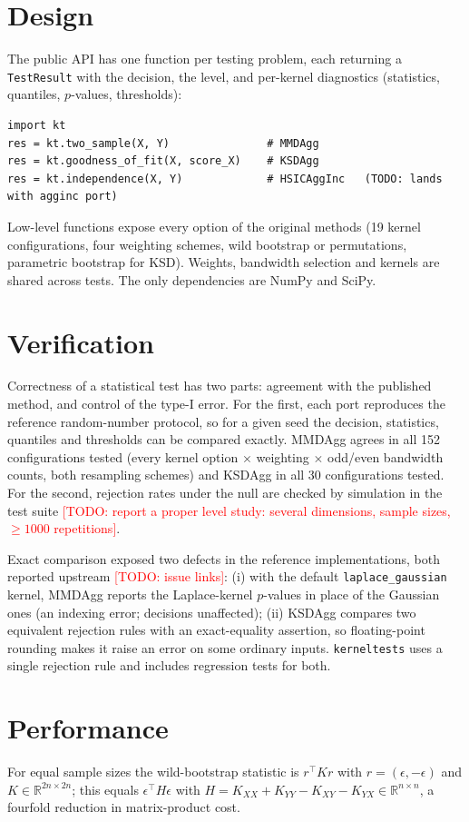 \documentclass[11pt]{article}
\newcommand{\todo}[1]{\textcolor{red}{[TODO: #1]}}
\begin{document}
\section{Design}
The public API has one function per testing problem, each returning a \texttt{TestResult} with the decision,
the level, and per-kernel diagnostics (statistics, quantiles, $p$-values, thresholds):
\begin{verbatim}
import kt
res = kt.two_sample(X, Y)               # MMDAgg
res = kt.goodness_of_fit(X, score_X)    # KSDAgg
res = kt.independence(X, Y)             # HSICAggInc   (TODO: lands with agginc port)
\end{verbatim}
Low-level functions expose every option of the original methods (19 kernel configurations, four weighting
schemes, wild bootstrap or permutations, parametric bootstrap for KSD). Weights, bandwidth selection and
kernels are shared across tests. The only dependencies are NumPy and SciPy.

\section{Verification}
Correctness of a statistical test has two parts: agreement with the published method, and control of the
type-I error. For the first, each port reproduces the reference random-number protocol, so for a given seed
the decision, statistics, quantiles and thresholds can be compared exactly. MMDAgg agrees in all 152
configurations tested (every kernel option $\times$ weighting $\times$ odd/even bandwidth counts, both resampling
schemes) and KSDAgg in all 30 configurations tested. For the second, rejection rates under the null are
checked by simulation in the test suite \todo{report a proper level study: several dimensions, sample sizes,
$\geq 1000$ repetitions}.

Exact comparison exposed two defects in the reference implementations, both reported upstream \todo{issue
links}: (i) with the default \texttt{laplace\_gaussian} kernel, MMDAgg reports the Laplace-kernel $p$-values in
place of the Gaussian ones (an indexing error; decisions unaffected); (ii) KSDAgg compares two equivalent
rejection rules with an exact-equality assertion, so floating-point rounding makes it raise an error on some
ordinary inputs. \texttt{kerneltests} uses a single rejection rule and includes regression tests for both.

\section{Performance}
For equal sample sizes the wild-bootstrap statistic is $r^\top K r$ with $r=(\epsilon,-\epsilon)$ and
$K\in\mathbb{R}^{2n\times 2n}$; this equals $\epsilon^\top H\epsilon$ with
$H=K_{XX}+K_{YY}-K_{XY}-K_{YX}\in\mathbb{R}^{n\times n}$, a fourfold reduction in matrix-product cost.
\end{document}
